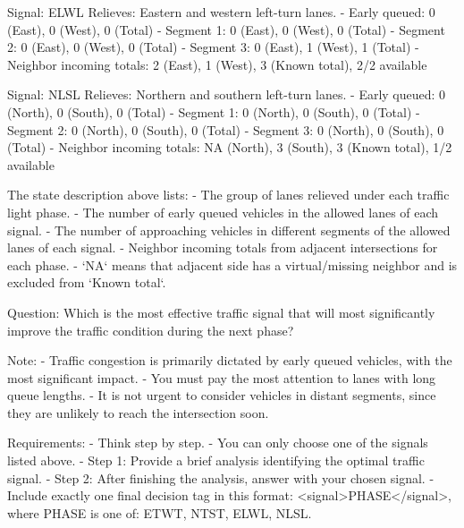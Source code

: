Signal: ELWL
Relieves: Eastern and western left-turn lanes.
- Early queued: 0 (East), 0 (West), 0 (Total)
- Segment 1: 0 (East), 0 (West), 0 (Total)
- Segment 2: 0 (East), 0 (West), 0 (Total)
- Segment 3: 0 (East), 1 (West), 1 (Total)
- Neighbor incoming totals: 2 (East), 1 (West), 3 (Known total), 2/2 available

Signal: NLSL
Relieves: Northern and southern left-turn lanes.
- Early queued: 0 (North), 0 (South), 0 (Total)
- Segment 1: 0 (North), 0 (South), 0 (Total)
- Segment 2: 0 (North), 0 (South), 0 (Total)
- Segment 3: 0 (North), 0 (South), 0 (Total)
- Neighbor incoming totals: NA (North), 3 (South), 3 (Known total), 1/2 available

The state description above lists:
- The group of lanes relieved under each traffic light phase.
- The number of early queued vehicles in the allowed lanes of each signal.
- The number of approaching vehicles in different segments of the allowed lanes of each signal.
- Neighbor incoming totals from adjacent intersections for each phase.
- `NA` means that adjacent side has a virtual/missing neighbor and is excluded from `Known total`.

Question:
Which is the most effective traffic signal that will most significantly improve the traffic condition during the next phase?

Note:
- Traffic congestion is primarily dictated by early queued vehicles, with the most significant impact.
- You must pay the most attention to lanes with long queue lengths.
- It is not urgent to consider vehicles in distant segments, since they are unlikely to reach the intersection soon.

Requirements:
- Think step by step.
- You can only choose one of the signals listed above.
- Step 1: Provide a brief analysis identifying the optimal traffic signal.
- Step 2: After finishing the analysis, answer with your chosen signal.
- Include exactly one final decision tag in this format: <signal>PHASE</signal>, where PHASE is one of: ETWT, NTST, ELWL, NLSL.
